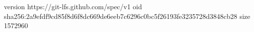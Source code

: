 version https://git-lfs.github.com/spec/v1
oid sha256:2a9efdf9cd85f8d6f8dc669de6eeb7c6296c0bc5f26193fe3235728d3848cb28
size 1572960
